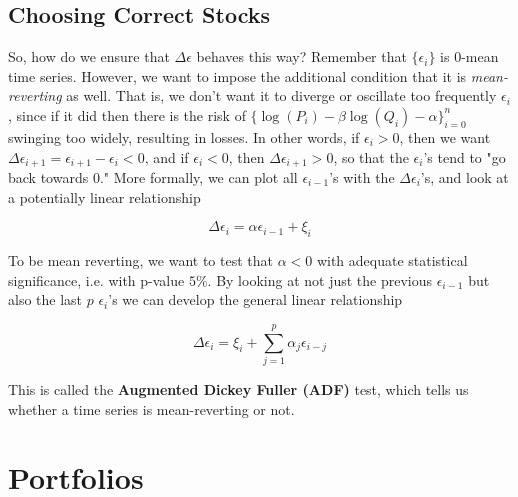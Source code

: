 \documentclass{article}
\begin{document}
  \subsection{Choosing Correct Stocks}

    So, how do we ensure that $\Delta \epsilon$ behaves this way? Remember that $\{\epsilon_i\}$ is $0$-mean time series. However, we want to impose the additional condition that it is \textit{mean-reverting} as well. That is, we don't want it to diverge or oscillate too frequently $\epsilon_i$, since if it did then there is the risk of $\{\log(P_i) - \beta \log(Q_i) - \alpha\}_{i=0}^n$ swinging too widely, resulting in losses. In other words, if $\epsilon_i > 0$, then we want $\Delta \epsilon_{i + 1} = \epsilon_{i+1} - \epsilon_i < 0$, and if $\epsilon_i < 0$, then $\Delta \epsilon_{i+1} > 0$, so that the $\epsilon_i$'s tend to "go back towards $0$." More formally, we can plot all $\epsilon_{i-1}$'s with the $\Delta \epsilon_i$'s, and look at a potentially linear relationship 

    \begin{equation}
      \Delta \epsilon_i = \alpha \epsilon_{i-1} + \xi_i
    \end{equation}

    To be mean reverting, we want to test that $\alpha < 0$ with adequate statistical significance, i.e. with p-value $5\%$. By looking at not just the previous $\epsilon_{i-1}$ but also the last $p$ $\epsilon_i$'s we can develop the general linear relationship 

    \begin{equation}
      \Delta \epsilon_i = \xi_i + \sum_{j=1}^p \alpha_j \epsilon_{i - j}
    \end{equation}

    This is called the \textbf{Augmented Dickey Fuller (ADF)} test, which tells us whether a time series is mean-reverting or not. 

\section{Portfolios}
\end{document}
